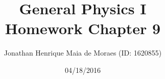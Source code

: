 \title{General Physics I \\ Homework Chapter 9}
\author{Jonathan Henrique Maia de Moraes (ID: 1620855)}
\date{04/18/2016}
\maketitle

